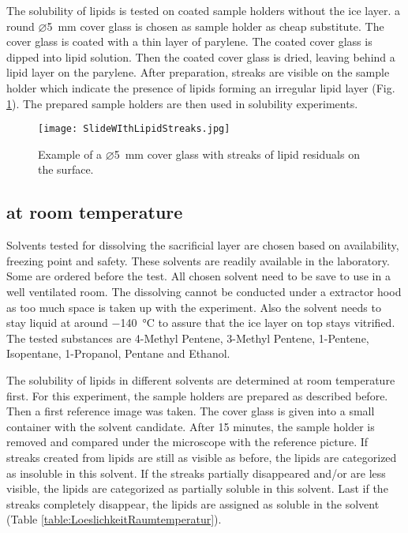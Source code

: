 
The solubility of lipids is tested on coated sample holders without the ice layer. a round $\varnothing$\SI{5}{\milli\meter} cover glass is chosen as sample holder as cheap substitute. The cover glass is coated with a thin layer of parylene. The coated cover glass is dipped into lipid solution. Then the coated cover glass is dried, leaving behind a lipid layer on the parylene. After preparation, streaks are visible on the sample holder which indicate the presence of lipids forming an irregular lipid layer (Fig. \ref{fig:streaksOnSampleHolder}). The prepared sample holders are then used in solubility experiments.

\begin{figure}[hbt!]
	\centering
	\texttt{[image: SlideWIthLipidStreaks.jpg]}
	\caption{Example of a $\varnothing$\SI{5}{\milli\meter} cover glass with streaks of lipid residuals on the surface.}
	\label{fig:streaksOnSampleHolder}
\end{figure}

\subsection{at room temperature}

Solvents tested for dissolving the sacrificial layer are chosen based on availability, freezing point and safety. These solvents are readily available in the laboratory. Some are ordered before the test. All chosen solvent need to be save to use in a well ventilated room. The dissolving cannot be conducted under a extractor hood as too much space is taken up with the experiment. Also the solvent needs to stay liquid at around \SI{-140}{\degreeCelsius} to assure that the ice layer on top stays vitrified. The tested substances are 4-Methyl Pentene, 3-Methyl Pentene, 1-Pentene, Isopentane, 1-Propanol, Pentane and Ethanol. 

The solubility of lipids in different solvents are determined at room temperature first. For this experiment, the sample holders are prepared as described before. Then a first reference image was taken. The cover glass is given into a small container with the solvent candidate. After 15 minutes, the sample holder is removed and compared under the microscope with the reference picture. If streaks created from lipids are still as visible as before, the lipids are categorized as insoluble in this solvent. If the streaks partially disappeared and/or are less visible, the lipids are categorized as partially soluble in this solvent. Last if the streaks completely disappear, the lipids are assigned as soluble in the solvent (Table \ref{table:LoeslichkeitRaumtemperatur}).


